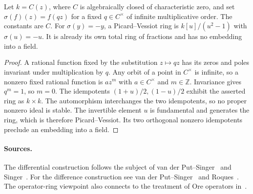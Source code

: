 \begin{example}
\label{res:PV10}
Let \(k=C(z)\), where \(C\) is algebraically closed of
characteristic zero, and set
\(\sigma(f)(z)=f(qz)\) for a fixed \(q\in C^\times\) of infinite
multiplicative order. The constants are \(C\). For
\(\sigma(y)=-y\), a Picard--Vessiot ring is
\(k[u]/(u^2-1)\) with \(\sigma(u)=-u\). It is already its
own total ring of fractions and has no embedding into a field.
\end{example}

\begin{proof}
A rational function fixed by the substitution \(z\mapsto qz\)
has its zeros and poles invariant under multiplication by \(q\).
Any orbit of a point in \(C^\times\) is infinite, so a nonzero
fixed rational function is \(az^m\) with \(a\in C^\times\) and
\(m\in\mathbb Z\). Invariance gives \(q^m=1\), so \(m=0\).
The idempotents \((1+u)/2,(1-u)/2\) exhibit the asserted ring
as \(k\times k\). The automorphism interchanges the two
idempotents, so no proper nonzero ideal is stable. The
invertible element \(u\) is fundamental and generates the ring,
which is therefore Picard--Vessiot. Its two orthogonal nonzero
idempotents preclude an embedding into a field.
\end{proof}

\paragraph{Sources.}
The differential construction follows the subject of
van der Put--Singer~\cite[Chapter 1, Sections 1.1--1.3]{vps-differential}
and Singer~\cite[Sections 1.2--1.3]{singer}. For the difference
construction see van der Put--Singer~\cite[Chapter 1, Section 1.1]{vps-difference}
and Roques~\cite[Definitions 7--8, Propositions 9 and 12, Theorems 13 and 17]{roques}.
The operator-ring viewpoint also connects to the treatment of Ore
operators in~\cite[Chapter 4]{mg-rm03d}.
